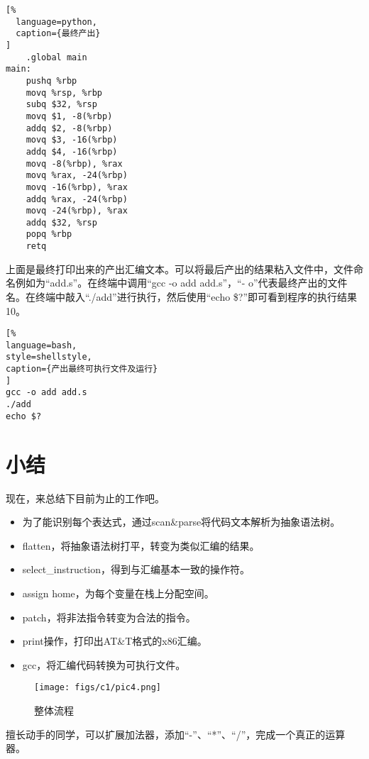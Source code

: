 \begin{lstlisting}[%
  language=python,
  caption={最终产出}
]
    .global main
main:
    pushq %rbp
    movq %rsp, %rbp
    subq $32, %rsp
    movq $1, -8(%rbp)
    addq $2, -8(%rbp)
    movq $3, -16(%rbp)
    addq $4, -16(%rbp)
    movq -8(%rbp), %rax
    movq %rax, -24(%rbp)
    movq -16(%rbp), %rax
    addq %rax, -24(%rbp)
    movq -24(%rbp), %rax
    addq $32, %rsp
    popq %rbp
    retq
\end{lstlisting}

上面是最终打印出来的产出汇编文本。可以将最后产出的结果粘入文件中，文件命名例如为“add.s”。在终端中调用“gcc -o add add.s”，“- o”代表最终产出的文件名。在终端中敲入“./add”进行执行，然后使用“echo \$?”即可看到程序的执行结果10。

\begin{lstlisting}[%
language=bash,
style=shellstyle,
caption={产出最终可执行文件及运行}
]
gcc -o add add.s
./add
echo $?
\end{lstlisting}

\section{小结}

现在，来总结下目前为止的工作吧。

\begin{itemize}
  \item 为了能识别每个表达式，通过scan\&parse将代码文本解析为抽象语法树。
  \item flatten，将抽象语法树打平，转变为类似汇编的结果。
  \item select\_instruction，得到与汇编基本一致的操作符。
  \item assign home，为每个变量在栈上分配空间。
  \item patch，将非法指令转变为合法的指令。
  \item print操作，打印出AT\&T格式的x86汇编。
  \item gcc，将汇编代码转换为可执行文件。
\end{itemize}

\begin{figure}[ht]
\centering
\texttt{[image: figs/c1/pic4.png]}
\caption{整体流程}
\label{fig:fig4}
\end{figure}

擅长动手的同学，可以扩展加法器，添加“-”、“*”、“/”，完成一个真正的运算器。
